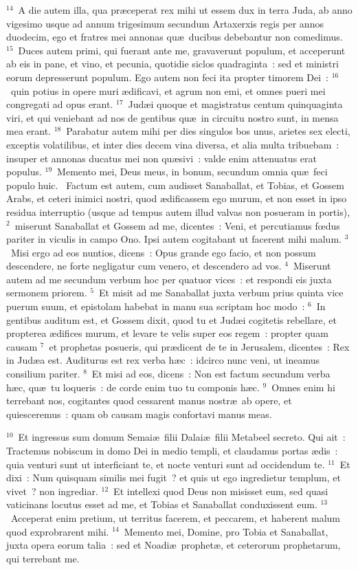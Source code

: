 ${}^{14}$~A die autem illa, qua pr\ae ceperat rex mihi ut essem dux in terra Juda, ab anno vigesimo usque ad annum trigesimum secundum Artaxerxis regis per annos duodecim, ego et fratres mei annonas qu\ae\ ducibus debebantur non comedimus.
${}^{15}$~Duces autem primi, qui fuerant ante me, gravaverunt populum, et acceperunt ab eis in pane, et vino, et pecunia, quotidie siclos quadraginta~: sed et ministri eorum depresserunt populum. Ego autem non feci ita propter timorem Dei~:
${}^{16}$~quin potius in opere muri \ae dificavi, et agrum non emi, et omnes pueri mei congregati ad opus erant.
${}^{17}$~Jud\ae i quoque et magistratus centum quinquaginta viri, et qui veniebant ad nos de gentibus qu\ae\ in circuitu nostro sunt, in mensa mea erant.
${}^{18}$~Parabatur autem mihi per dies singulos bos unus, arietes sex electi, exceptis volatilibus, et inter dies decem vina diversa, et alia multa tribuebam~: insuper et annonas ducatus mei non qu\ae sivi~: valde enim attenuatus erat populus.
${}^{19}$~Memento mei, Deus meus, in bonum, secundum omnia qu\ae\ feci populo huic.
~Factum est autem, cum audisset Sanaballat, et Tobias, et Gossem Arabs, et ceteri inimici nostri, quod \ae dificassem ego murum, et non esset in ipso residua interruptio (usque ad tempus autem illud valvas non posueram in portis),
${}^{2}$~miserunt Sanaballat et Gossem ad me, dicentes~: Veni, et percutiamus fœdus pariter in viculis in campo Ono. Ipsi autem cogitabant ut facerent mihi malum.
${}^{3}$~Misi ergo ad eos nuntios, dicens~: Opus grande ego facio, et non possum descendere, ne forte negligatur cum venero, et descendero ad vos.
${}^{4}$~Miserunt autem ad me secundum verbum hoc per quatuor vices~: et respondi eis juxta sermonem priorem.
${}^{5}$~Et misit ad me Sanaballat juxta verbum prius quinta vice puerum suum, et epistolam habebat in manu sua scriptam hoc modo~:
${}^{6}$~In gentibus auditum est, et Gossem dixit, quod tu et Jud\ae i cogitetis rebellare, et propterea \ae difices murum, et levare te velis super eos regem~: propter quam causam
${}^{7}$~et prophetas posueris, qui pr\ae dicent de te in Jerusalem, dicentes~: Rex in Jud\ae a est. Auditurus est rex verba h\ae c~: idcirco nunc veni, ut ineamus consilium pariter.
${}^{8}$~Et misi ad eos, dicens~: Non est factum secundum verba h\ae c, qu\ae\ tu loqueris~: de corde enim tuo tu componis h\ae c.
${}^{9}$~Omnes enim hi terrebant nos, cogitantes quod cessarent manus nostr\ae\ ab opere, et quiesceremus~: quam ob causam magis confortavi manus meas.


${}^{10}$~Et ingressus sum domum Semai\ae\ filii Dalai\ae\ filii Metabeel secreto. Qui ait~: Tractemus nobiscum in domo Dei in medio templi, et claudamus portas \ae dis~: quia venturi sunt ut interficiant te, et nocte venturi sunt ad occidendum te.
${}^{11}$~Et dixi~: Num quisquam similis mei fugit~? et quis ut ego ingredietur templum, et vivet~? non ingrediar.
${}^{12}$~Et intellexi quod Deus non misisset eum, sed quasi vaticinans locutus esset ad me, et Tobias et Sanaballat conduxissent eum.
${}^{13}$~Acceperat enim pretium, ut territus facerem, et peccarem, et haberent malum quod exprobrarent mihi.
${}^{14}$~Memento mei, Domine, pro Tobia et Sanaballat, juxta opera eorum talia~: sed et Noadi\ae\ prophet\ae , et ceterorum prophetarum, qui terrebant me.


